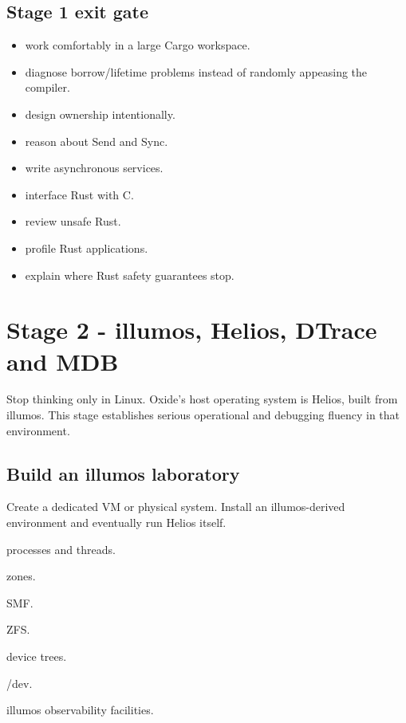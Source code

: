 \documentclass[11pt,letterpaper]{article}
\begin{document}
\subsection*{Stage 1 exit gate}

\begin{itemize}

\item work comfortably in a large Cargo workspace.

\item diagnose borrow/lifetime problems instead of randomly appeasing the compiler.

\item design ownership intentionally.

\item reason about Send and Sync.

\item write asynchronous services.

\item interface Rust with C.

\item review unsafe Rust.

\item profile Rust applications.

\item explain where Rust safety guarantees stop.

\end{itemize}

\section{Stage 2 - illumos, Helios, DTrace and MDB}\label{sec:6}

\label{stage:2}

Stop thinking only in Linux. Oxide's host operating system is Helios, built from illumos. This stage establishes serious operational and debugging fluency in that environment.

\subsection*{Build an illumos laboratory}

Create a dedicated VM or physical system. Install an illumos-derived environment and eventually run Helios itself.

\begin{topics}

\item processes and threads.

\item zones.

\item SMF.

\item ZFS.

\item device trees.

\item /dev.

\item illumos observability facilities.

\end{topics}
\end{document}
